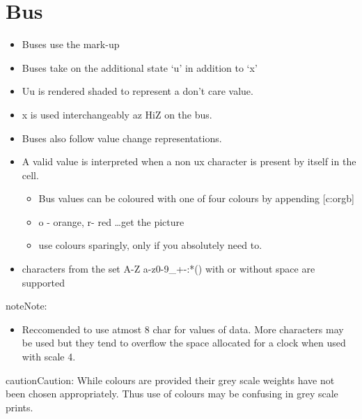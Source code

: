 \documentclass[letterpaper,10pt,english]{sphinxmanual}
\begin{document}
\section{Bus}
\label{\detokenize{step_by_step:bus}}\begin{itemize}
\item {} 
Buses use the mark-up 

\item {} 
Buses take on the additional state ‘u’ in addition to ‘x’

\item {} 
U\textbar{}u is rendered shaded to represent a don’t care value.

\item {} 
x is used interchangeably az HiZ on the bus.

\item {} 
Buses also follow value change representations.

\item {} 
A valid value is interpreted when a non u\textbar{}x character is present by itself in the cell.
\begin{itemize}
\item {} 
Bus values can be coloured with one of four colours by appending {[}c:o\textbar{}r\textbar{}g\textbar{}b{]}

\item {} 
o - orange, r- red …get the picture

\item {} 
use colours sparingly, only if you absolutely need to.

\end{itemize}

\item {} 
characters from the set A-Z a-z0-9\_+-:*() with or without space are supported

\end{itemize}

\begin{sphinxadmonition}{note}{Note:}\begin{itemize}
\item {} 
Reccomended to use atmost 8 char for values of data. More characters may be used but
they tend to overflow the space allocated for a clock when used with scale 4.

\end{itemize}
\end{sphinxadmonition}

\begin{sphinxadmonition}{caution}{Caution:}
While colours are provided their grey scale weights have not been chosen appropriately. Thus use of colours may be confusing in grey scale prints.
\end{sphinxadmonition}
\end{document}
